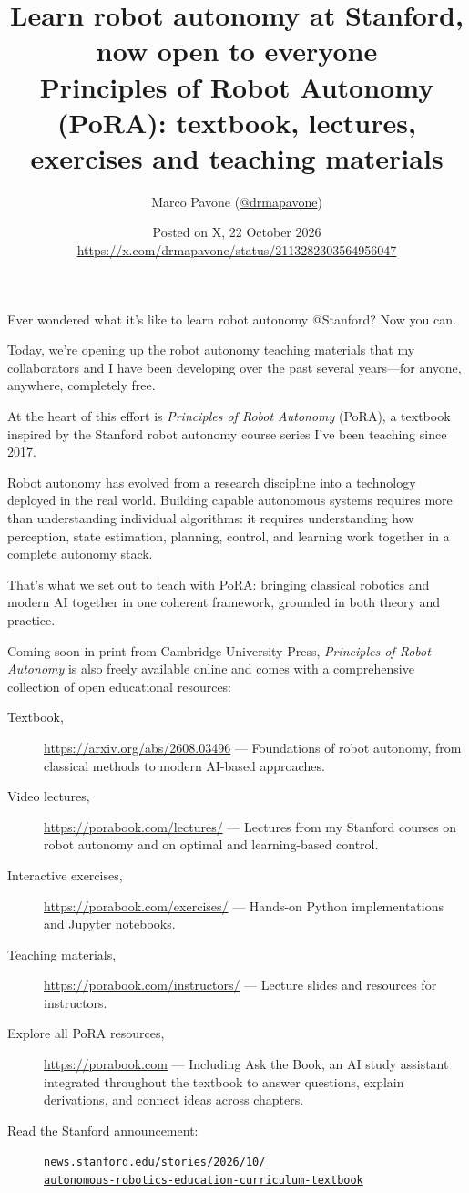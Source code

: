 \documentclass[11pt]{article}
\title{\textbf{Learn robot autonomy at Stanford, now open to everyone}\\[0.3em]
\large Principles of Robot Autonomy (PoRA): textbook, lectures, exercises and teaching materials}
\author{Marco Pavone (\href{https://x.com/drmapavone}{@drmapavone})}
\date{Posted on X, 22 October 2026\\[0.3em]
\small\url{https://x.com/drmapavone/status/2113282303564956047}}
\begin{document}
\maketitle

Ever wondered what it's like to learn robot autonomy @Stanford? Now you can.

Today, we're opening up the robot autonomy teaching materials that my collaborators and I have been developing over the past several years---for anyone, anywhere, completely free.

At the heart of this effort is \emph{Principles of Robot Autonomy} (PoRA), a textbook inspired by the Stanford robot autonomy course series I've been teaching since 2017.

Robot autonomy has evolved from a research discipline into a technology deployed in the real world. Building capable autonomous systems requires more than understanding individual algorithms: it requires understanding how perception, state estimation, planning, control, and learning work together in a complete autonomy stack.

That's what we set out to teach with PoRA: bringing classical robotics and modern AI together in one coherent framework, grounded in both theory and practice.

Coming soon in print from Cambridge University Press, \emph{Principles of Robot Autonomy} is also freely available online and comes with a comprehensive collection of open educational resources:

\begin{description}
  \item[Textbook,] \url{https://arxiv.org/abs/2608.03496} --- Foundations of robot autonomy, from classical methods to modern AI-based approaches.
  \item[Video lectures,] \url{https://porabook.com/lectures/} --- Lectures from my Stanford courses on robot autonomy and on optimal and learning-based control.
  \item[Interactive exercises,] \url{https://porabook.com/exercises/} --- Hands-on Python implementations and Jupyter notebooks.
  \item[Teaching materials,] \url{https://porabook.com/instructors/} --- Lecture slides and resources for instructors.
  \item[Explore all PoRA resources,] \url{https://porabook.com} --- Including Ask the Book, an AI study assistant integrated throughout the textbook to answer questions, explain derivations, and connect ideas across chapters.
  \item[Read the Stanford announcement:] \href{https://news.stanford.edu/stories/2026/10/autonomous-robotics-education-curriculum-textbook}{\nolinkurl{news.stanford.edu/stories/2026/10/}\\ \nolinkurl{autonomous-robotics-education-curriculum-textbook}}
\end{description}
\end{document}

